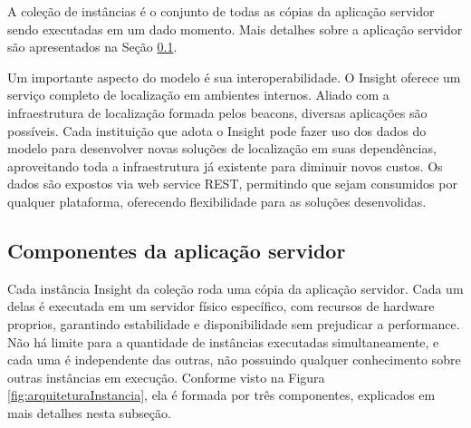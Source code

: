 \documentclass[twoside,english,brazilian]{UNISINOSartigo}
\begin{document}
A coleção de instâncias é o conjunto de todas as cópias da aplicação servidor sendo executadas em um dado momento. Mais detalhes sobre a aplicação servidor são apresentados na Seção \ref{componentesAplicacaoServidor}.

Um importante aspecto do modelo é sua interoperabilidade. O Insight oferece um serviço completo de localização em ambientes internos. Aliado com a infraestrutura de localização formada pelos beacons, diversas aplicações são possíveis. Cada instituição que adota o Insight pode fazer uso dos dados do modelo para desenvolver novas soluções de localização em suas dependências, aproveitando toda a infraestrutura já existente para diminuir novos custos. Os dados são expostos via web service REST, permitindo que sejam consumidos por qualquer plataforma, oferecendo flexibilidade para as soluções desenvolidas.

\subsection{Componentes da aplicação servidor}\label{componentesAplicacaoServidor}
Cada instância Insight da coleção roda uma cópia da aplicação servidor. Cada um delas é executada em um servidor físico específico, com recursos de hardware proprios, garantindo estabilidade e disponibilidade sem prejudicar a performance. Não há limite para a quantidade de instâncias executadas simultaneamente, e cada uma é independente das outras, não possuindo qualquer conhecimento sobre outras instâncias em execução. Conforme visto na Figura \ref{fig:arquiteturaInstancia}, ela é formada por três componentes, explicados em mais detalhes nesta subseção.
\end{document}
